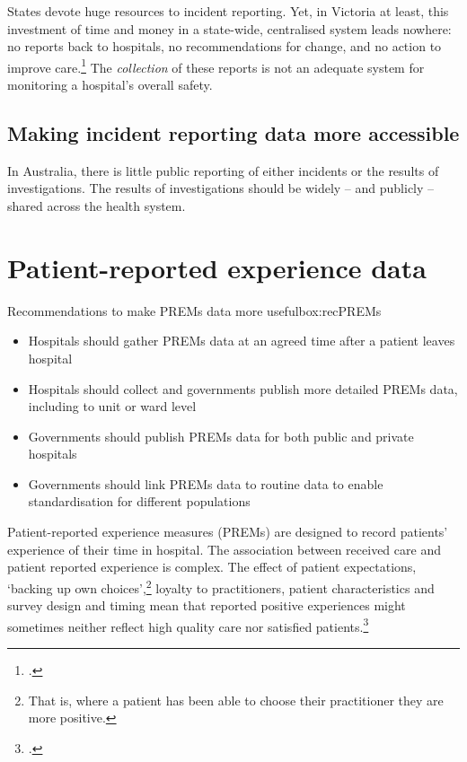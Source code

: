 \documentclass[FrontPage]{grattan}
\begin{document}
States devote huge resources to incident reporting. Yet, in Victoria at least, this investment of time and money in a state-wide, centralised system leads nowhere: no reports back to hospitals, no recommendations for change, and no action to improve care.\footcite{duckett2016targeting} The \textit{collection} of these reports is not an adequate system for monitoring a hospital’s overall safety.

\subsection{Making incident reporting data more accessible}\label{subsec:incidentaccess}
In Australia, there is little public reporting of either incidents or the results of investigations. The results of investigations should be widely -- and publicly -- shared across the health system.


\section{Patient-reported experience data}\label{sec:PREMs}

\begin{addsmallbox}{Recommendations to make PREMs data more useful}{box:recPREMs}
\begin{itemize}[leftmargin=*]
    \item Hospitals should gather PREMs data at an agreed time after a patient leaves hospital
    \item Hospitals should collect and governments publish more detailed PREMs data, including to unit or ward level
    \item Governments should publish PREMs data for both public and private hospitals
    \item Governments should link PREMs data to routine data to enable standardisation for different populations
\end{itemize}

\end{addsmallbox}

Patient-reported experience measures (PREMs) are designed to record patients’ experience of their time in hospital. The association between received care and patient reported experience is complex. The effect of patient expectations, ‘backing up own choices’,\footnote{That is, where a patient has been able to choose their practitioner they are more positive.}
loyalty to practitioners, patient characteristics and survey design and timing mean that reported positive experiences might sometimes neither reflect high quality care nor satisfied patients.\footcite{sandager2016please}
\end{document}
